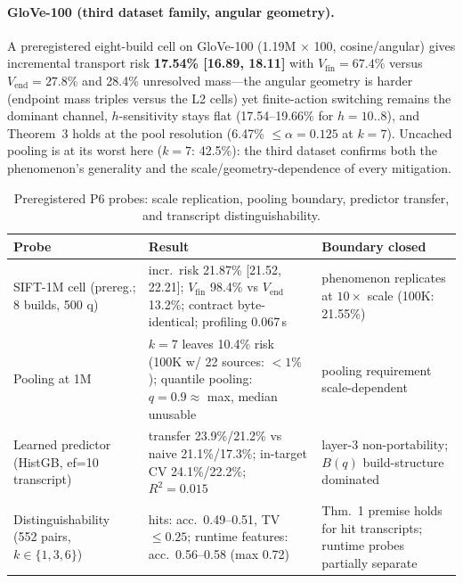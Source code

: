 \documentclass{article}
\begin{document}
\paragraph{GloVe-100 (third dataset family, angular geometry).}
A preregistered eight-build cell on GloVe-100 (1.19M $\times$ 100, cosine/angular) gives incremental
transport risk \textbf{17.54\% [16.89, 18.11]} with $V_{\mathrm{fin}}{=}67.4\%$ versus
$V_{\mathrm{end}}{=}27.8\%$ and 28.4\% unresolved mass---the angular geometry is harder (endpoint
mass triples versus the L2 cells) yet finite-action switching remains the dominant channel,
$h$-sensitivity stays flat (17.54--19.66\% for $h{=}10{..}8$), and Theorem~3 holds at the pool
resolution (6.47\% $\le\alpha{=}0.125$ at $k{=}7$). Uncached pooling is at its worst here
($k{=}7$: 42.5\%): the third dataset confirms both the phenomenon's generality and the
scale/geometry-dependence of every mitigation.

\begin{table}[t]
\centering
\caption{Preregistered P6 probes: scale replication, pooling boundary, predictor transfer, and transcript
distinguishability.}
\label{tab:p6}
\footnotesize
\setlength{\tabcolsep}{3pt}
\begin{tabular}{p{3.2cm}p{6.3cm}p{4.2cm}}
\toprule
Probe & Result & Boundary closed \\
\midrule
SIFT-1M cell (prereg.; 8 builds, 500 q) & incr.\ risk 21.87\% [21.52, 22.21]; $V_{\mathrm{fin}}$ 98.4\% vs $V_{\mathrm{end}}$ 13.2\%; contract byte-identical; profiling 0.067\,s & phenomenon replicates at $10\times$ scale (100K: 21.55\%) \\
Pooling at 1M & $k{=}7$ leaves 10.4\% risk (100K w/ 22 sources: $<1\%$); quantile pooling: $q{=}0.9 \approx$ max, median unusable & pooling requirement scale-dependent \\
Learned predictor (HistGB, ef{=}10 transcript) & transfer 23.9\%/21.2\% vs naive 21.1\%/17.3\%; in-target CV 24.1\%/22.2\%; $R^2=0.015$ & layer-3 non-portability; $B(q)$ build-structure dominated \\
Distinguishability (552 pairs, $k\in\{1,3,6\}$) & hits: acc.\ 0.49--0.51, TV $\le0.25$; runtime features: acc.\ 0.56--0.58 (max 0.72) & Thm.~1 premise holds for hit transcripts; runtime probes partially separate \\
\bottomrule
\end{tabular}
\end{table}
\end{document}
